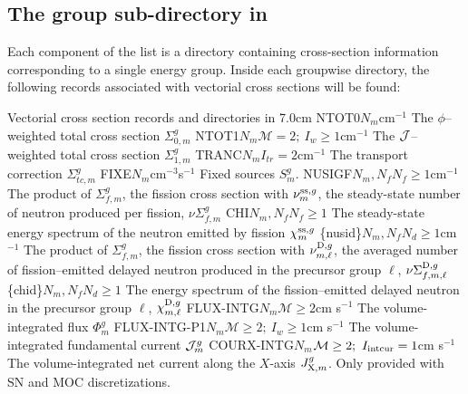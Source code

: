 \subsection{The group sub-directory  in }\label{sect:macrolibdirgroup}

Each component of the list  is a directory containing cross-section information
corresponding to a single energy group. Inside each groupwise directory, the following
records associated with vectorial cross sections will be found:

\begin{DescriptionEnregistrement}{Vectorial cross section records and directories in
}{7.0cm}
\label{tabl:tabnonlegendre}
\RealEnr
  {NTOT0}{$N_{m}$}{cm$^{-1}$}
  {The $\phi$--weighted total cross section $\Sigma_{0,m}^{g}$}
\OptRealEnr
  {NTOT1}{$N_{m}$}{$\mathcal{M}=2; \ I_{w}\ge 1$}{cm$^{-1}$}
  {The ${\cal J}$--weighted total cross section $\Sigma_{1,m}^{g}$}
\OptRealEnr
  {TRANC}{$N_{m}$}{$I_{tr}=2$}{cm$^{-1}$} 
  {The transport correction $\Sigma_{tc,m}^{g}$}
\RealEnr
  {FIXE}{$N_{m}$}{cm$^{-3}$s$^{-1}$}
  {Fixed sources $S_{m}^{g}$.}
\OptRealEnr
  {NUSIGF}{$N_{m},N_{f}$}{$N_{f}\ge 1$}{cm$^{-1}$} 
  {The product of $\Sigma_{f,m}^{g}$, the fission cross section with
   $\nu_{m}^{{\rm ss},g}$, the steady-state number of neutron produced per fission,
   $\nu\Sigma_{f,m}^{g}$}
\OptRealEnr
  {CHI}{$N_{m},N_{f}$}{$N_{f}\ge 1$}{}
  {The steady-state energy spectrum of the neutron emitted by fission $\chi_{m}^{{\rm ss},g}$}
\OptRealVar
  {\{nusid\}}{$N_{m},N_{f}$}{$N_{d}\ge 1$}{cm$^{-1}$} 
  {The product of $\Sigma_{f,m}^{g}$, the fission cross section with
   $\nu_{m,\ell}^{{\rm D},g}$, the averaged number of fission--emitted delayed
   neutron produced in the precursor group $\ell$,
   $\nu\Sigma_{f,m,\ell}^{{\rm D},g}$}
\OptRealVar
  {\{chid\}}{$N_{m},N_{f}$}{$N_{d}\ge 1$}{}
  {The energy spectrum of the fission--emitted delayed neutron
  in the precursor group $\ell$, $\chi_{m,\ell}^{{\rm D},g}$}
\OptRealEnr
  {FLUX-INTG}{$N_{m}$}{$\mathcal{M}\ge 2$}{cm s$^{-1}$}  
  {The volume-integrated flux $\Phi_{m}^{g}$}
\OptRealEnr
  {FLUX-INTG-P1}{$N_{m}$}{$\mathcal{M}\ge 2; \ I_{w}\ge 1$}{cm s$^{-1}$}  
  {The volume-integrated fundamental current ${\cal J}_{m}^{g}$}
\OptRealEnr
  {COURX-INTG}{$N_{m}$}{$\mathcal{M}\ge 2; \ I_{\rm intcur}=1$}{cm s$^{-1}$}  
  {The volume-integrated net current along the $X$-axis $J_{{\rm X},m}^{g}$. Only provided
  with SN and MOC discretizations.}

\end{DescriptionEnregistrement}
